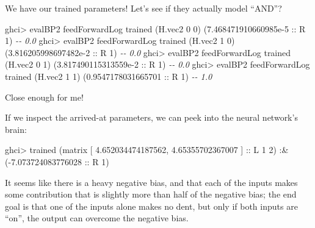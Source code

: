 \documentclass[]{article}
\newenvironment{Shaded}{}{}
\newcommand{\CommentTok}[1]{\textcolor[rgb]{0.38,0.63,0.69}{\textit{#1}}}
\newcommand{\DataTypeTok}[1]{\textcolor[rgb]{0.56,0.13,0.00}{#1}}
\newcommand{\DecValTok}[1]{\textcolor[rgb]{0.25,0.63,0.44}{#1}}
\newcommand{\FloatTok}[1]{\textcolor[rgb]{0.25,0.63,0.44}{#1}}
\newcommand{\NormalTok}[1]{#1}
\newcommand{\OperatorTok}[1]{\textcolor[rgb]{0.40,0.40,0.40}{#1}}
\newcommand{\OtherTok}[1]{\textcolor[rgb]{0.00,0.44,0.13}{#1}}
\begin{document}
We have our trained parameters! Let's see if they actually model ``AND''?

\begin{Shaded}
\begin{Highlighting}[]
\NormalTok{ghci}\OperatorTok{\textgreater{}}\NormalTok{ evalBP2 feedForwardLog trained (H.vec2 }\DecValTok{0} \DecValTok{0}\NormalTok{)}
\NormalTok{(}\FloatTok{7.468471910660985e{-}5}\OtherTok{ ::} \DataTypeTok{R} \DecValTok{1}\NormalTok{)       }\CommentTok{{-}{-} 0.0}
\NormalTok{ghci}\OperatorTok{\textgreater{}}\NormalTok{ evalBP2 feedForwardLog trained (H.vec2 }\DecValTok{1} \DecValTok{0}\NormalTok{)}
\NormalTok{(}\FloatTok{3.816205998697482e{-}2}\OtherTok{ ::} \DataTypeTok{R} \DecValTok{1}\NormalTok{)       }\CommentTok{{-}{-} 0.0}
\NormalTok{ghci}\OperatorTok{\textgreater{}}\NormalTok{ evalBP2 feedForwardLog trained (H.vec2 }\DecValTok{0} \DecValTok{1}\NormalTok{)}
\NormalTok{(}\FloatTok{3.817490115313559e{-}2}\OtherTok{ ::} \DataTypeTok{R} \DecValTok{1}\NormalTok{)       }\CommentTok{{-}{-} 0.0}
\NormalTok{ghci}\OperatorTok{\textgreater{}}\NormalTok{ evalBP2 feedForwardLog trained (H.vec2 }\DecValTok{1} \DecValTok{1}\NormalTok{)}
\NormalTok{(}\FloatTok{0.9547178031665701}\OtherTok{ ::} \DataTypeTok{R} \DecValTok{1}\NormalTok{)         }\CommentTok{{-}{-} 1.0}
\end{Highlighting}
\end{Shaded}

Close enough for me!

If we inspect the arrived-at parameters, we can peek into the neural network's
brain:

\begin{Shaded}
\begin{Highlighting}[]
\NormalTok{ghci}\OperatorTok{\textgreater{}}\NormalTok{ trained}
\NormalTok{(matrix}
\NormalTok{ [ }\FloatTok{4.652034474187562}\NormalTok{, }\FloatTok{4.65355702367007}\NormalTok{ ]}\OtherTok{ ::} \DataTypeTok{L} \DecValTok{1} \DecValTok{2}\NormalTok{) }\OperatorTok{:\&}\NormalTok{ (}\OperatorTok{{-}}\FloatTok{7.073724083776028}\OtherTok{ ::} \DataTypeTok{R} \DecValTok{1}\NormalTok{)}
\end{Highlighting}
\end{Shaded}

It seems like there is a heavy negative bias, and that each of the inputs makes
some contribution that is slightly more than half of the negative bias; the end
goal is that one of the inputs alone makes no dent, but only if both inputs are
``on'', the output can overcome the negative bias.
\end{document}
